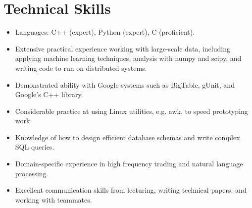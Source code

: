\documentclass[]{article}
\begin{document}
\vspace{-0.5cm}
\section*{Technical Skills}

\begin{itemize}%
\item {Languages: C++ (expert), Python (expert), C (proficient).}
\item {Extensive practical experience working with large-scale data, including applying machine learning techniques, analysis with numpy and scipy, and writing code to run on distributed systems.}
\item {Demonstrated ability with Google systems such as BigTable, gUnit, and Google's C++ library.}
\item {Considerable practice at using Linux utilities, e.g. awk, to speed prototyping work.}
\item {Knowledge of how to design efficient database schemas and write complex SQL queries.} 
\item {Domain-specific experience in high frequency trading and natural language processing.}
\item {Excellent communication skills from lecturing, writing technical papers, and working with teammates.}
\end{itemize}

\end{document}
